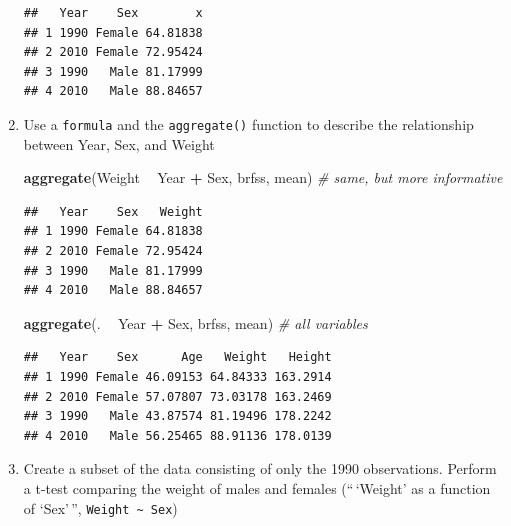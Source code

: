 \documentclass[]{article}
\newenvironment{Shaded}{\begin{snugshade}}{\end{snugshade}}
\newcommand{\KeywordTok}[1]{\textcolor[rgb]{0.13,0.29,0.53}{\textbf{#1}}}
\newcommand{\DecValTok}[1]{\textcolor[rgb]{0.00,0.00,0.81}{#1}}
\newcommand{\StringTok}[1]{\textcolor[rgb]{0.31,0.60,0.02}{#1}}
\newcommand{\CommentTok}[1]{\textcolor[rgb]{0.56,0.35,0.01}{\textit{#1}}}
\newcommand{\OperatorTok}[1]{\textcolor[rgb]{0.81,0.36,0.00}{\textbf{#1}}}
\newcommand{\NormalTok}[1]{#1}
\theoremstyle{definition}
\theoremstyle{definition}
\theoremstyle{remark}
\begin{document}
\begin{enumerate}
\begin{verbatim}
##   Year    Sex        x
## 1 1990 Female 64.81838
## 2 2010 Female 72.95424
## 3 1990   Male 81.17999
## 4 2010   Male 88.84657
\end{verbatim}
\item
  Use a \texttt{formula} and the \texttt{aggregate()} function to
  describe the relationship between Year, Sex, and Weight

\begin{Shaded}
\begin{Highlighting}[]
\KeywordTok{aggregate}\NormalTok{(Weight }\OperatorTok{~}\StringTok{ }\NormalTok{Year }\OperatorTok{+}\StringTok{ }\NormalTok{Sex, brfss, mean)  }\CommentTok{# same, but more informative}
\end{Highlighting}
\end{Shaded}

\begin{verbatim}
##   Year    Sex   Weight
## 1 1990 Female 64.81838
## 2 2010 Female 72.95424
## 3 1990   Male 81.17999
## 4 2010   Male 88.84657
\end{verbatim}

\begin{Shaded}
\begin{Highlighting}[]
\KeywordTok{aggregate}\NormalTok{(. }\OperatorTok{~}\StringTok{ }\NormalTok{Year }\OperatorTok{+}\StringTok{ }\NormalTok{Sex, brfss, mean)       }\CommentTok{# all variables}
\end{Highlighting}
\end{Shaded}

\begin{verbatim}
##   Year    Sex      Age   Weight   Height
## 1 1990 Female 46.09153 64.84333 163.2914
## 2 2010 Female 57.07807 73.03178 163.2469
## 3 1990   Male 43.87574 81.19496 178.2242
## 4 2010   Male 56.25465 88.91136 178.0139
\end{verbatim}
\item
  Create a subset of the data consisting of only the 1990 observations.
  Perform a t-test comparing the weight of males and females
  (``\,`Weight' as a function of `Sex'\,'',
  \texttt{Weight\ \textasciitilde{}\ Sex})

\begin{Shaded}
\end{Shaded}


\end{enumerate}
\end{document}
